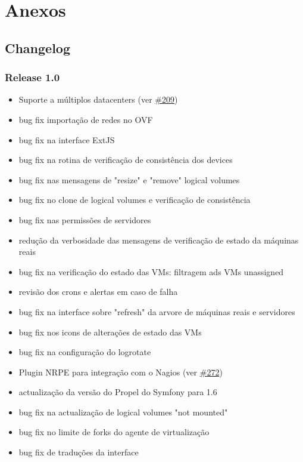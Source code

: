 \chapter{Anexos}

\section{Changelog}

\subsection{Release 1.0}

\begin{itemize}
	\item Suporte a múltiplos datacenters (ver \href{https://srcmaster.eurotux.com/pm/p/etva/ticket/209}{\#209})
	\item bug fix importação de redes no OVF
	\item bug fix na interface ExtJS
	\item bug fix na rotina de verificação de consistência dos devices
	\item bug fix nas mensagens de "resize" e "remove" logical volumes
	\item bug fix no clone de logical volumes e verificação de consistência
	\item bug fix nas permissões de servidores
	\item redução da verbosidade das mensagens de verificação de estado da máquinas reais
	\item bug fix na verificação do estado das VMs: filtragem ads VMs unassigned
	\item revisão dos crons e alertas em caso de falha
	\item bug fix na interface sobre "refresh" da arvore de máquinas reais e servidores
	\item bug fix nos icons de alterações de estado das VMs
	\item bug fix na configuração do logrotate
	\item Plugin NRPE para integração com o Nagios (ver \href{https://srcmaster.eurotux.com/pm/p/etva/ticket/272}{\#272})
	\item actualização da versão do Propel do Symfony para 1.6
	\item bug fix na actualização de logical volumes "not mounted"
	\item bug fix no limite de forks do agente de virtualização
	\item bug fix de traduções da interface

\end{itemize}
